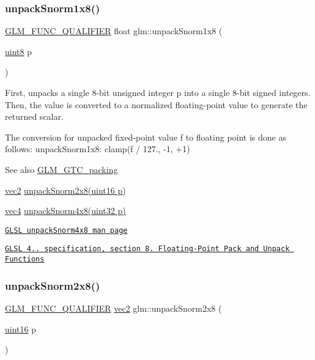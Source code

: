 \subsubsection{\texorpdfstring{unpack\+Snorm1x8()}{unpackSnorm1x8()}}
{\footnotesize\ttfamily \hyperlink{setup_8hpp_a33fdea6f91c5f834105f7415e2a64407}{G\+L\+M\+\_\+\+F\+U\+N\+C\+\_\+\+Q\+U\+A\+L\+I\+F\+I\+ER} float glm\+::unpack\+Snorm1x8 (\begin{DoxyParamCaption}\item[{\hyperlink{group__gtc__type__precision_ga1a7dcd8aac97cc8020817c94049deff2}{uint8}}]{p }\end{DoxyParamCaption})}

First, unpacks a single 8-\/bit unsigned integer p into a single 8-\/bit signed integers. Then, the value is converted to a normalized floating-\/point value to generate the returned scalar.

The conversion for unpacked fixed-\/point value f to floating point is done as follows\+: unpack\+Snorm1x8\+: clamp(f / 127., -\/1, +1)

\begin{DoxySeeAlso}{See also}
\hyperlink{group__gtc__packing}{G\+L\+M\+\_\+\+G\+T\+C\+\_\+packing} 

\hyperlink{group__core__types_gaa1618f51db67eaa145db101d8c8431d8}{vec2} \hyperlink{group__gtc__packing_ga27f30f0281b88e152b0895f5e2ead878}{unpack\+Snorm2x8(uint16 p)} 

\hyperlink{group__core__types_ga5881b1b022d7fd1b7218f5916532dd02}{vec4} \hyperlink{group__core__func__packing_ga2db488646d48b7c43d3218954523fe82}{unpack\+Snorm4x8(uint32 p)} 

\href{http://www.opengl.org/sdk/docs/manglsl/xhtml/unpackSnorm4x8.xml}{\tt G\+L\+SL unpack\+Snorm4x8 man page} 

\href{http://www.opengl.org/registry/doc/GLSLangSpec.4.20.8.pdf}{\tt G\+L\+SL 4.. specification, section 8. Floating-\/\+Point Pack and Unpack Functions} 
\end{DoxySeeAlso}
\mbox{\label{group__gtc__packing_ga27f30f0281b88e152b0895f5e2ead878}} 
\subsubsection{\texorpdfstring{unpack\+Snorm2x8()}{unpackSnorm2x8()}}
{\footnotesize\ttfamily \hyperlink{setup_8hpp_a33fdea6f91c5f834105f7415e2a64407}{G\+L\+M\+\_\+\+F\+U\+N\+C\+\_\+\+Q\+U\+A\+L\+I\+F\+I\+ER} \hyperlink{group__core__types_gaa1618f51db67eaa145db101d8c8431d8}{vec2} glm\+::unpack\+Snorm2x8 (\begin{DoxyParamCaption}\item[{\hyperlink{group__gtc__type__precision_gad8c2939e1fdd8e5828b31d95c52255d5}{uint16}}]{p }\end{DoxyParamCaption})}

